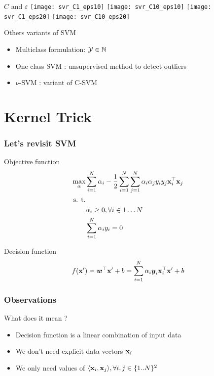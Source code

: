 \documentclass[11pt, pdf, compress, handout]{beamer}
\begin{document}
\begin{frame}{$C$ and $\varepsilon$}
  \texttt{[image: svr\_C1\_eps10]}
  \texttt{[image: svr\_C10\_eps10]}
  \texttt{[image: svr\_C1\_eps20]}
  \texttt{[image: svr\_C10\_eps20]}
  
\end{frame}


\begin{frame}{Others variants of SVM}
  \begin{itemize}
  \item Multiclass formulation: ${\mathcal{Y}} \in \mathbb{N}$
  \item One class SVM : unsupervised method to detect outliers
  \item $\nu$-SVM : variant of C-SVM
  \end{itemize}

\end{frame}
\begin{frame}[plain]
  
\end{frame}

\section{Kernel Trick}
\begin{frame}
  \frametitle{Let's revisit SVM}
  
  \begin{block}{Objective function}
    \begin{align*}
      \max_{\alpha} & \sum_{i=1}^N \alpha_i - \frac{1}{2} \sum_{i=1}^N
      \sum_{j=1}^N \alpha_i \alpha_j y_i y_j {\mathbf{x}}_i^\top {\mathbf{x}}_j \\
      \text{s. t.}  & \\
      &\alpha_i \geq 0 , \forall i \in 1 \dots N \\
      & \sum_{i=1}^N \alpha_i y_i = 0
    \end{align*}
  \end{block}
  
  \begin{block}{Decision function}
    $$
      f({\mathbf{x}}') = {\boldsymbol{w}}^\top {\mathbf{x}}' + b = \sum_{i=1}^N
      \alpha_i {\boldsymbol{y}}_i {\mathbf{x}}_i^\top{\mathbf{x}}' + b
    $$

  \end{block}
\end{frame}
\begin{frame}
  \frametitle{Observations}
  \begin{block}{What does it mean ?}
    

    \begin{itemize}
    \item Decision function is a linear combination of input data
    \item We don't need explicit data vectors ${\mathbf{x}}_i$
    \item We only need values of $\langle {\mathbf{x}}_i, {\mathbf{x}}_j \rangle, \forall i,j \in
      \{1 .. N\}^2$
    \end{itemize}
  \end{block}

\end{frame}
\end{document}
